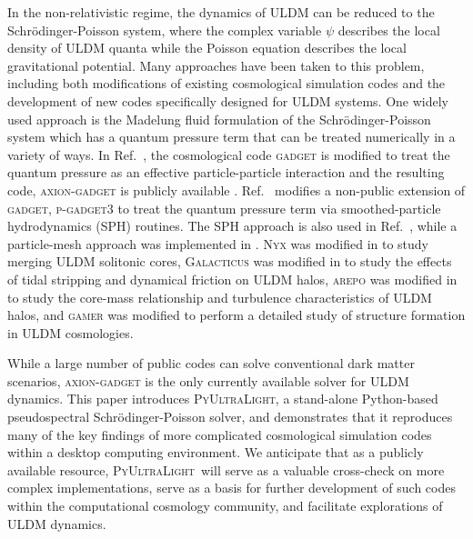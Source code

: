 \documentclass[a4paper,11pt]{article}
\newcommand{\PyUltraLight}{\textsc{PyUltraLight}\xspace}
\begin{document}
In the non-relativistic regime, the dynamics of ULDM can be reduced to the Schr{\"o}dinger-Poisson  system, where the complex variable $\psi$ describes the local density of ULDM quanta while the Poisson equation describes the local gravitational potential. Many approaches have been taken to this problem, including both modifications of existing cosmological simulation codes and the development of new codes specifically designed for ULDM systems. One widely used approach is the Madelung fluid formulation of the Schr{\"o}dinger-Poisson system \cite{Madelung1926} which has a quantum pressure term that can be treated numerically in a variety of ways. In Ref.~\cite{Zhang2018}, the cosmological code \textsc{gadget} \cite{Springel2005} is modified to treat the quantum pressure as an effective particle-particle interaction and the resulting code, \textsc{axion-gadget} is publicly available \cite{axion-gadget}.  Ref.~\cite{Nori2018} modifies a non-public extension of \textsc{gadget}, \textsc{p-gadget3} to treat the quantum pressure term via smoothed-particle hydrodynamics (SPH) routines. The SPH approach is also  used in Ref.~\cite{Mocz2015}, while a particle-mesh approach was implemented in \cite{Veltmaat2016}. N\textsc{yx} \cite{Almgren2013} was modified in \cite{Schwabe2016} to study merging ULDM solitonic cores, G\textsc{alacticus} \cite{Benson2012} was modified in \cite{Du2017} to study the effects of tidal stripping and dynamical friction on ULDM halos, \textsc{arepo} \cite{Springel2010} was modified in \cite{Mocz2017} to study the core-mass relationship and turbulence characteristics of ULDM halos, and \textsc{gamer} \cite{Schive2010, gamer} was modified \cite{Schive2014_b} to perform a detailed study of structure formation in ULDM cosmologies. 

While a large number of public codes can solve conventional dark matter scenarios, \textsc{axion-gadget} is the only currently available solver for ULDM dynamics. This paper introduces \PyUltraLight, a stand-alone Python-based pseudospectral Schr{\"o}dinger-Poisson solver, and  demonstrates that it reproduces many of the key findings of more complicated cosmological simulation codes within a desktop computing environment. We anticipate that as a publicly available resource, \PyUltraLight\ will serve as a valuable cross-check on more complex implementations, serve as a basis for further development of such codes within the computational cosmology community, and facilitate explorations of ULDM dynamics.   
\end{document}
